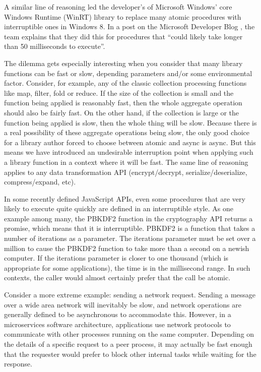 \documentclass[sigplan,10pt,review,anonymous]{acmart}\settopmatter{printfolios=true,printccs=false,printacmref=false}
\begin{document}
A similar line of reasoning led the developer's of Microsoft Windows' core Windows Runtime (WinRT) library to replace many atomic procedures with interruptible ones in Windows 8.
In a post on the Microsoft Developer Blog \cite{Windows8Team2012}, the team explains that they did this for procedures that ``could likely take longer than 50 milliseconds to execute''.

The dilemma gets especially interesting when you consider that many library functions can be fast or slow, depending parameters and/or some environmental factor.
Consider, for example, any of the classic collection processing functions like map, filter, fold or reduce.
If the size of the collection is small and the function being applied is reasonably fast, then the whole aggregate operation should also be fairly fast.
On the other hand, if the collection is large or the function being applied is slow, then the whole thing will be slow.
Because there is a real possibility of these aggregate operations being slow, the only good choice for a library author forced to choose between atomic and async is async.
But this means we have introduced an undesirable interruption point when applying such a library function in a context where it will be fast.
The same line of reasoning applies to any data transformation API (encrypt/decrypt, serialize/deserialize, compress/expand, etc).

In some recently defined JavaScript APIs, even some procedures that are very likely to execute quite quickly are defined in an interruptible style.
As one example among many, the PBKDF2 function in the cryptography API returns a promise, which means that it is interruptible.
PBKDF2 is a function that takes a number of iterations as a parameter.
The iterations parameter must be set over a million to cause the PBKDF2 function to take more than a second on a newish computer.
If the iterations parameter is closer to one thousand (which is appropriate for some applications), the time is in the millisecond range.
In such contexts, the caller would almost certainly prefer that the call be atomic.

Consider a more extreme example: sending a network request.
Sending a message over a wide area network will inevitably be slow, and network operations are generally defined to be asynchronous to accommodate this.
However, in a microservices software architecture, applications use network protocols to communicate with other processes running on the same computer.
Depending on the details of a specific request to a peer process, it may actually be fast enough that the requester would prefer to block other internal tasks while waiting for the response.
\end{document}
